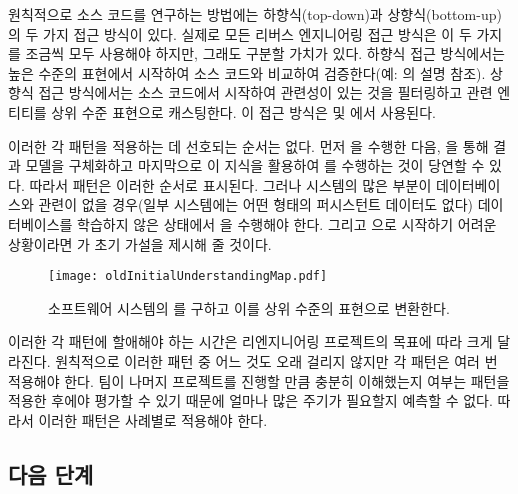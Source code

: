 \documentclass[a4paper,10pt,twoside]{book}
\begin{document}
원칙적으로 소스 코드를 연구하는 방법에는 하향식(top-down)과 상향식(bottom-up)의 두 가지 접근 방식이 있다. 실제로 모든 리버스 엔지니어링 접근 방식은 이 두 가지를 조금씩 모두 사용해야 하지만, 그래도 구분할 가치가 있다. 하향식 접근 방식에서는 높은 수준의 표현에서 시작하여 소스 코드와 비교하여 검증한다(예: 의 설명 참조). 상향식 접근 방식에서는 소스 코드에서 시작하여 관련성이 있는 것을 필터링하고 관련 엔티티를 상위 수준 표현으로 캐스팅한다. 이 접근 방식은  및 에서 사용된다.

이러한 각 패턴을 적용하는 데 선호되는 순서는 없다. 먼저 을 수행한 다음, 을 통해 결과 모델을 구체화하고 마지막으로 이 지식을 활용하여 를 수행하는 것이 당연할 수 있다. 따라서 패턴은 이러한 순서로 표시된다. 그러나 시스템의 많은 부분이 데이터베이스와 관련이 없을 경우(일부 시스템에는 어떤 형태의 퍼시스턴트 데이터도 없다) 데이터베이스를 학습하지 않은 상태에서 을 수행해야 한다. 그리고 으로 시작하기 어려운 상황이라면 가 초기 가설을 제시해 줄 것이다.

\begin{figure}
\begin{center}
\texttt{[image: oldInitialUnderstandingMap.pdf]}
\caption{소프트웨어 시스템의 를 구하고 이를 상위 수준의 표현으로 변환한다.}
\end{center}
\end{figure}

이러한 각 패턴에 할애해야 하는 시간은 리엔지니어링 프로젝트의 목표에 따라 크게 달라진다. 원칙적으로 이러한 패턴 중 어느 것도 오래 걸리지 않지만 각 패턴은 여러 번 적용해야 한다. 팀이 나머지 프로젝트를 진행할 만큼 충분히 이해했는지 여부는 패턴을 적용한 후에야 평가할 수 있기 때문에 얼마나 많은 주기가 필요할지 예측할 수 없다. 따라서 이러한 패턴은 사례별로 적용해야 한다.

\subsection*{다음 단계}
\end{document}
